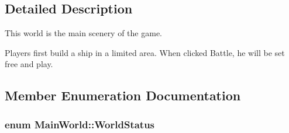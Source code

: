 \subsection{Detailed Description}
This world is the main scenery of the game. 

Players first build a ship in a limited area. When clicked Battle, he will be set free and play. 

\subsection{Member Enumeration Documentation}
\hypertarget{classMainWorld_ab0b1d1d54026f907ddc7fcc858ea48f3}{}
\subsubsection[{World\+Status}]{\setlength{\rightskip}{0pt plus 5cm}enum {\bf Main\+World\+::\+World\+Status}}\label{classMainWorld_ab0b1d1d54026f907ddc7fcc858ea48f3}
